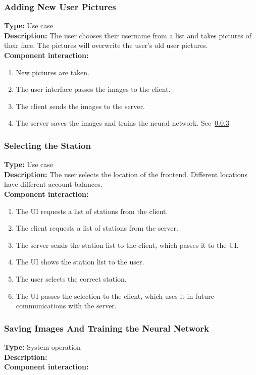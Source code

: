 \documentclass[11pt]{article}
\begin{document}
\subsubsection{Adding New User Pictures}
\textbf{Type:} Use case\\
\textbf{Description:} The user chooses their username from a list and takes pictures of their face. 
The pictures will overwrite the user's old user pictures.\\
\textbf{Component interaction:}
\begin{enumerate} 
\item{New pictures are taken.}
\item{The user interface passes the images to the client.}
\item{The client sends the images to the server.}
\item{The server saves the images and trains the neural network. See~\ref{sec:add-train}}
\end{enumerate}

\subsubsection{Selecting the Station}
\textbf{Type:} Use case\\
\textbf{Description:} The user selects the location of the frontend. Different locations
have different account balances.\\
\textbf{Component interaction:}\\
\begin{enumerate}
\item{The UI requests a list of stations from the client.}
\item{The client requests a list of stations from the server.}
\item{The server sends the station list to the client, which passes it to the UI.}
\item{The UI shows the station list to the user.}
\item{The user selects the correct station.}
\item{The UI passes the selection to the client, which uses it in future communications with
the server.}
\end{enumerate}

\subsubsection{Saving Images And Training the Neural Network}
\label{sec:add-train}
\textbf{Type:} System operation\\
\textbf{Description:}\\
\textbf{Component interaction:}\\
\end{document}
